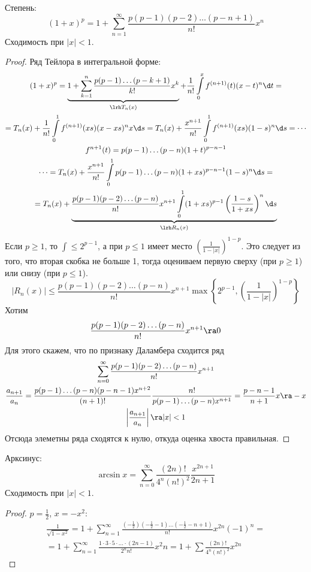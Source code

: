 Степень:
\[
	(1+x)^p = 1 + \sum_{n=1}^\infty \frac{p(p-1)(p-2)\dots(p-n+1)}{n!}x^n
\]
Сходимость при $|x| < 1$.
\begin{proof}
	Ряд Тейлора в интегральной форме:
	\begin{gather*}
		(1+x)^p
		= \underbrace{1 + \sum_{k=1}^n \frac{p(p-1)\dots(p-k+1)}{k!}x^k}_{\lrh T_n(x)}
			+ \frac1{n!}\int\limits_0^x f^{(n+1)}(t) (x-t)^n \d t = \\
		= T_n(x) + \frac1{n!} \int\limits_0^1 f^{(n+1)}(xs)(x-xs)^n x \d s
		= T_n(x) + \frac{x^{n+1}}{n!} \int\limits_0^1 f^{(n+1)}(xs)(1-s)^n \d s
		= \cdots \\
		f^{n+1} (t) = p(p-1)\dots(p-n)(1+t)^{p-n-1} \\
		\cdots
		= T_n(x) + \frac{x^{n+1}}{n!} \int\limits_0^1 p(p-1)\dots(p-n)(1+xs)^{p-n-1} (1-s)^n \d s = \\
		= T_n(x) + \underbrace{\frac{p(p-1)(p-2)\dots(p-n)}{n!}x^{n+1} \int\limits_0^1 (1+xs)^{p-1} \left(\frac{1-s}{1+xs}\right)^n \d s}_{\lrh R_n(x)}
	\end{gather*}
	Если $p \ge 1$, то $\int \le 2^{p-1}$, а при $p \le 1$ имеет место $\left(\frac1{1-|x|}\right)^{1-p}$.
	Это следует из того, что вторая скобка не больше 1, тогда оцениваем первую сверху (при $p \ge 1$) или снизу (при $p \le 1$).
	\[
		|R_n(x)| \le \frac{p(p-1)(p-2)\dots(p-n)}{n!}x^{n+1} \max \left\{2^{p-1}, \left(\frac1{1-|x|}\right)^{1-p}\right\}
	\]
	Хотим
	\[ \frac{p(p-1)(p-2)\dots(p-n)}{n!}x^{n+1} \ra 0 \]
	Для этого скажем, что по признаку Даламбера сходится ряд
	\begin{gather*}
		\sum_{n=0}^\infty \frac{p(p-1)(p-2)\dots(p-n)}{n!}x^{n+1} \\
		\frac{a_{n+1}}{a_n}
		= \frac{p(p-1)\dots(p-n)(p-n-1)x^{n+2}}{(n+1)!} \frac{n!}{p(p-1)\dots(p-n)x^{n+1}}
		= \frac{p-n-1}{n+1} x \ra -x \\
		\left|\frac{a_{n+1}}{a_n}\right| \ra |x| < 1
	\end{gather*}
	Отсюда элеметны ряда сходятся к нулю, откуда оценка хвоста правильная.
\end{proof}

Арксинус:
\[
	\arcsin x = \sum_{n=0}^\infty \frac{(2n)!}{4^n(n!)^2} \frac{x^{2n+1}}{2n+1}
\]
Сходимость при $|x| < 1$.
\begin{proof}
	$p = \frac12$, $x = -x^2$:
	\begin{gather*}
		\frac1{\sqrt{1-x^2}}
		= 1 + \sum_{n=1}^\infty \frac{\left(-\frac12\right)\left(-\frac12-1\right)\dots\left(-\frac12-n+1\right)}{n!} x^{2n} (-1)^n = \\
		= 1 + \sum_{n=1}^\infty \frac{1 \cdot 3 \cdot 5 \cdot \dots \cdot (2n-1)}{2^n n!}{x^2n}
		= 1 + \sum \frac{(2n)!}{4^n (n!)^2} x^{2n}
	\end{gather*}
\end{proof}

